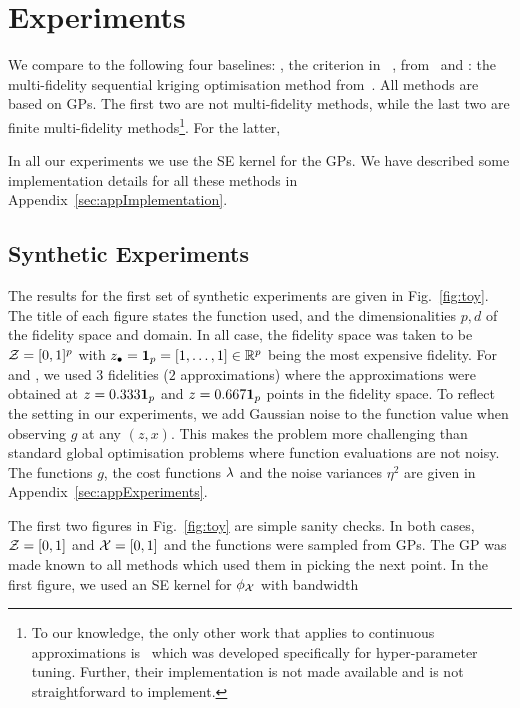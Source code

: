 
\section{Experiments}
\label{sec:experiments}

We compare \bocas to the following four baselines: 
\gpucb, the \gpeis criterion in \bayo~\citep{jones98expensive}, 
\mfgpucbones from~\citet{kandasamy16mfbo} and
\mfsko: the multi-fidelity sequential kriging optimisation method
from~\citet{huang06mfKriging}.
All methods are based on GPs.
The first two are not multi-fidelity methods, while the last two are finite multi-fidelity
methods\footnote{%
To our knowledge, the only other work that applies to continuous approximations
is~\citet{klein2015towards} which was developed specifically for hyper-parameter tuning.
Further, their implementation is not made available and is not straightforward to
implement.
}.
For the latter,

In all our experiments we use the SE kernel for the GPs.
We have described some implementation details for all these methods in
Appendix~\ref{sec:appImplementation}.


\subsection{Synthetic Experiments}
\label{sec:synthetic}

\insertToyResultsFigure

The results for the first set of synthetic experiments are given in Fig.~\ref{fig:toy}.
The title of each figure states the function used, and the dimensionalities $p,d$ of the
fidelity space and domain.
In all case, the fidelity space was taken to be $\mathcal{Z}=[0,1]^p$ with
$z_{\bullet} = {\bf 1}_p = [1,\dots,1]\in\mathbb{R}^p$
being the most expensive fidelity.
For \mfgpucbones and \mfsko, we used $3$ fidelities ($2$ approximations) where the
approximations were obtained at $z=0.333{\bf 1}_p$ and $z=0.667{\bf 1}_p$ points in the fidelity
space.
To reflect the setting in our experiments, we add Gaussian noise to the function value
when observing $g$ at any $(z,x)$.
This makes the problem more challenging than standard global optimisation problems
where function evaluations are not noisy.
The functions $g$, the cost functions $\lambda$ and the noise variances $\eta^2$ are given
in Appendix~\ref{sec:appExperiments}.

The first two figures in Fig.~\ref{fig:toy} are simple sanity checks.
In both cases, $\mathcal{Z}=[0,1]$ and $\mathcal{X}=[0,1]$ and the functions were sampled from GPs. 
The GP was made known to all methods which used them in picking the next point.
In the first figure, we used an SE kernel for $\phi_{\mathcal{X}}$ with bandwidth 

